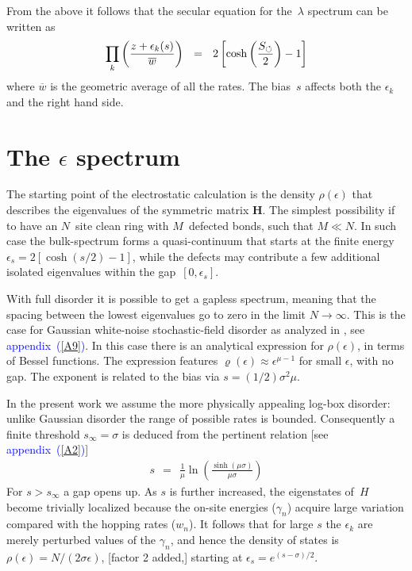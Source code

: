 \documentclass[aps,pre,floats,floatfix,twocolumn]{revtex4}
\newcommand{\be}[1]{\begin{eqnarray}\ifthenelse{#1=-1}{\nonumber}{\ifthenelse{#1=0}{}{\label{e#1}}}}
\newcommand{\beq}{\begin{eqnarray}}
\newcommand{\eeq}{\end{eqnarray}}
\newcommand{\Ap}[1]{\textcolor{blue}{{appendix}\!~(\ref{#1})}}
\newcommand{\rmrk}[1]{{\color[rgb]{0.6,0,0.1} #1}}
\begin{document}
From the above it follows that the secular equation for the~$\lambda$ 
spectrum can be written as  
%
\be{20}
\prod_k \left(\frac{z+\epsilon_k(s)}{\overline{w}}\right) \ \ = \ \ 2\left[\cosh\left(\frac{S_{\circlearrowleft}}{2}\right)-1\right]
\eeq
%
where ${\overline{w}}$ is the geometric average of all the rates.
The bias~$s$ affects both the $\epsilon_k$ and the right hand side.


\section{The $\epsilon$ spectrum}

The starting point of the electrostatic calculation 
is the density $\rho(\epsilon)$ that describes 
the eigenvalues of the symmetric matrix $\bm{H}$. 
%
The simplest possibility if to have an $N$~site clean 
ring with $M$~defected bonds, such that $M\ll N$. 
In such case the bulk-spectrum forms a quasi-continuum 
that starts at the finite energy ${\epsilon_s=2[\cosh(s/2)-1]}$, 
while the defects may contribute a few additional 
isolated eigenvalues within the gap~$[0,\epsilon_s]$.   


With full disorder it is possible to get a gapless spectrum, 
meaning that the spacing between the lowest 
eigenvalues go to zero in the limit $N\rightarrow\infty$. 
This is the case for Gaussian white-noise stochastic-field disorder 
as analyzed in \cite{odh3}, see \Ap{A9}.
In this case there is an analytical expression 
for $\rho(\epsilon)$, in terms of Bessel functions.
The expression features $\varrho(\epsilon) \approx \epsilon^{\mu-1}$ 
for small $\epsilon$, with no gap.  
The exponent is related to the bias via ${s=(1/2) \sigma^2 \mu}$. 


In the present work we assume the more physically appealing log-box 
disorder: unlike Gaussian disorder the range of possible rates is bounded. 
Consequently a finite threshold ${s_{\infty}=\sigma}$ 
is deduced from the pertinent relation [see \Ap{A2}]
%
\beq
s \ \ = \ \ \frac{1}{\mu} \ln\left( \frac{\sinh (\mu \sigma)}{\mu \sigma} \right)
\eeq
%
For ${s>s_{\infty}}$ a gap opens up. As $s$ is further increased,  
the eigenstates of~$H$ become trivially localized because the on-site energies ($\gamma_n$)
acquire large variation compared with the hopping rates ($w_n$).  
It follows that for large $s$ the $\epsilon_k$ are merely perturbed 
values of the $\gamma_n$, and hence the density of states 
is $\rho(\epsilon) = {N}/(2\sigma \epsilon)$, \rmrk{[factor 2 added,]}  
starting at ${\epsilon_s = e^{(s-\sigma)/2}}$. 
\end{document}
